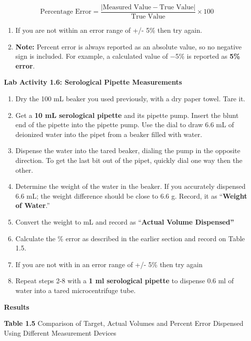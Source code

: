 \documentclass[
  letterpaper,
  DIV=11,
  numbers=noendperiod]{scrreprt}
\begin{document}
\[\text{Percentage Error} = \dfrac{|\text{Measured Value} - \text{True Value}|}{\text{True Value}} \times 100\]

\begin{enumerate}
\def\labelenumi{\arabic{enumi}.}
\setcounter{enumi}{8}
\item
  If you are not within an error range of +/- 5\% then try again.
\item
  \textbf{Note:} Percent error is always reported as an absolute value,
  so no negative sign is included. For example, a calculated value of
  −5\% is reported as \textbf{5\% error}.
\end{enumerate}

\textbf{Lab Activity 1.6: Serological Pipette Measurements}

\begin{enumerate}
\def\labelenumi{\arabic{enumi}.}
\item
  Dry the 100 mL beaker you used previously, with a dry paper towel.
  Tare it.
\item
  Get a \textbf{10 mL serological pipette} and its pipette pump. Insert
  the blunt end of the pipette into the pipette pump. Use the dial to
  draw 6.6 mL of deionized water into the pipet from a beaker filled
  with water.
\item
  Dispense the water into the tared beaker, dialing the pump in the
  opposite direction. To get the last bit out of the pipet, quickly dial
  one way then the other.
\item
  Determine the weight of the water in the beaker. If you accurately
  dispensed 6.6 mL; the weight difference should be close to 6.6 g.
  Record, it as ``\textbf{Weight of Water}.''
\item
  Convert the weight to mL and record as ``\textbf{Actual Volume
  Dispensed''}
\item
  Calculate the \% error as described in the earlier section and record
  on Table 1.5.
\item
  If you are not with in an error range of +/- 5\% then try again
\item
  Repeat steps 2-8 with a \textbf{1 ml serological pipette} to dispense
  0.6 ml of water into a tared microcentrifuge tube.
\end{enumerate}

\textbf{Results}

\textbf{Table 1.5} Comparison of Target, Actual Volumes and Percent
Error Dispensed Using Different Measurement Devices
\end{document}

